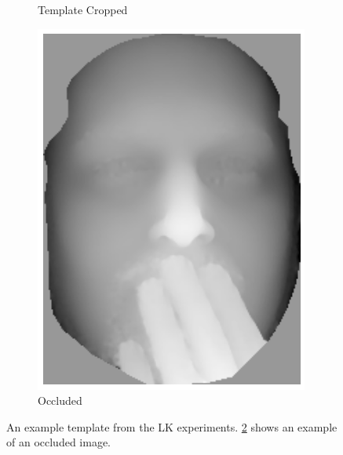\begin{figure}[t]
\begin{subfigure}[b]{0.2\textwidth}
    	\caption{Template Cropped}\label{subfig:singl_img_depth_2d_lk_template_cropped}
    \end{subfigure} \hfill
    \begin{subfigure}[b]{0.2\textwidth}
    	\includegraphics[width=\textwidth]{statistical_normals/images/lk2d/bs004_occluded.png}
    	\caption{Occluded}\label{subfig:singl_img_depth_2d_lk_template_occluded}
    \end{subfigure}
    \hspace*{\fill}
    \caption{An example template from the LK experiments.
             \cref{subfig:singl_img_depth_2d_lk_template_occluded} shows an
             example of an occluded image.}
\label{fig:single_img_2d_lk_examples}
\end{figure}

